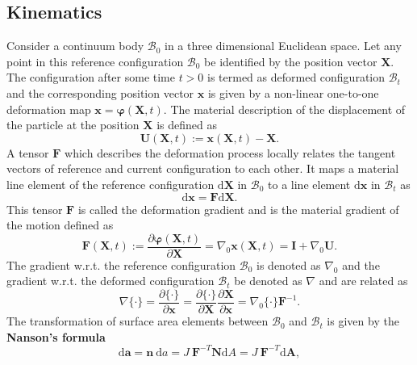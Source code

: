 \documentclass[11pt,a4paper,final]{article}
\begin{document}
\subsection{Kinematics}
Consider a continuum body $\mathcal{B}_0$ in a three dimensional Euclidean space. Let any point in this reference configuration $\mathcal{B}_0$ be identified by the position vector $\mathbf{X}$. The configuration after some time $t > 0$ is termed as deformed configuration $\mathcal{B}_t$ and the corresponding position vector $\mathbf{x}$ is given by a non-linear one-to-one deformation map $\mathbf{x} = \bm{\varphi} (\mathbf{X}, t)$. The material description of the displacement of the particle at the position $\mathbf{X}$ is defined as
\begin{equation}
\mathbf{U}(\mathbf{X}, t) := \mathbf{x}(\mathbf{X}, t) - \mathbf{X}.
\end{equation}
A tensor $\mathbf{F}$ which describes the deformation process locally relates the tangent vectors of reference and current configuration to each other. It maps a material line element of the reference configuration $\bm{\mathrm{d}}\mathbf{X}$ in $\mathcal{B}_0$ to a line element $\bm{\mathrm{d}\mathbf{x}}$ in $\mathcal{B}_t$ as 
\begin{equation}
\bm{\mathrm{d}\mathbf{x}} = \mathbf{F} \bm{\mathrm{d}\mathbf{X}}.
\end{equation} 
This tensor $\mathbf{F}$ is called the deformation gradient and is the material gradient of the motion defined as
\begin{equation}
\mathbf{F}(\mathbf{X}, t) := \dfrac{\partial \bm{\varphi}(\mathbf{X}, t)}{\partial \mathbf{X}} = \nabla_0 \mathbf{x}(\mathbf{X}, t) = \mathbf{I} + \nabla_0 \mathbf{U}.
\label{eq:1.3}
\end{equation}
The gradient w.r.t. the reference configuration $\mathcal{B}_0$ is denoted as $\nabla_0$ and the gradient w.r.t. the deformed configuration $\mathcal{B}_t$ be denoted as $\nabla$ and are related as 
\begin{equation}
\nabla \{ \cdot \} = \dfrac{\partial \{ \cdot \} }{\partial \mathbf{x}} = \dfrac{\partial \{ \cdot \} }{\partial \mathbf{X}} \dfrac{\partial \mathbf{X}}{\partial \mathbf{x}} = \nabla_0 \{ \cdot \} \mathbf{F}^{-1}.
\end{equation} 
The transformation of surface area elements between $\mathcal{B}_0$ and $\mathcal{B}_t$ is given by the \textbf{Nanson's formula}
\begin{equation}
\bm{\mathrm{d}}\mathbf{a} = \mathbf{n} \ \mathrm{d}a = J \ \mathbf{F}^{-T} \mathbf{N} \mathrm{d}A = J \ \mathbf{F}^{-T} \bm{\mathrm{d}}\mathbf{A},
\end{equation}
\end{document}
